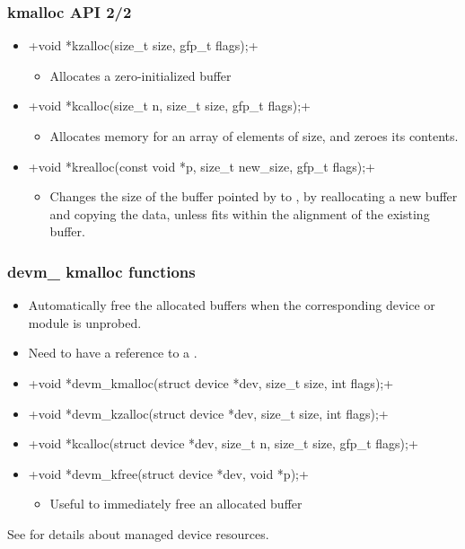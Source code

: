 \begin{frame}[fragile]
  \frametitle{kmalloc API 2/2}
  \begin{itemize}
  \item {}+void *kzalloc(size_t size, gfp_t flags);+
    \begin{itemize}
    \item Allocates a zero-initialized buffer
    \end{itemize}
  \item {}+void *kcalloc(size_t n, size_t size, gfp_t flags);+
    \begin{itemize}
    \item Allocates memory for an array of  elements of
       size, and zeroes its contents.
    \end{itemize}
  \item {\footnotesize {}+void *krealloc(const void *p, size_t new_size, gfp_t flags);+}
    \begin{itemize}
    \item Changes the size of the buffer pointed by  to
      , by reallocating a new buffer and copying the
      data, unless  fits within the alignment of
      the existing buffer.
    \end{itemize}
  \end{itemize}
\end{frame}

\begin{frame}[fragile]
  \frametitle{devm\_ kmalloc functions}
  \begin{itemize}
  \item Automatically free the allocated buffers when the 
        corresponding device or module is unprobed.
  \item Need to have a reference to a .
  \item {\footnotesize {}+void *devm_kmalloc(struct device *dev, size_t size, int flags);+}
  \item {\footnotesize {}+void *devm_kzalloc(struct device *dev, size_t size, int flags);+}
  \item {\scriptsize {}+void *kcalloc(struct device *dev, size_t n, size_t size, gfp_t flags);+}
  \item {\small {}+void *devm_kfree(struct device *dev, void *p);+}
        \begin{itemize}
        \item Useful to immediately free an allocated buffer
        \end{itemize}
  \end{itemize}
  See  for details about managed
  device resources.
\end{frame}

